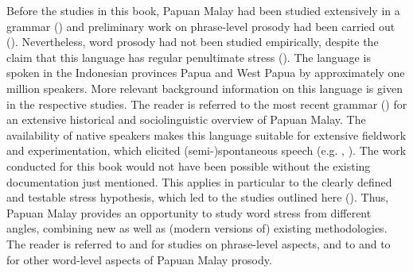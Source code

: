 Before the studies in this book, Papuan Malay had been studied extensively in a grammar (\citealt{kluge_grammar_2017}) and preliminary work on phrase-level prosody had been carried out (\citealt{riesberg_perception_2018}). Nevertheless, word prosody had not been studied empirically, despite the claim that this language has regular penultimate stress (\citealt{kluge_grammar_2017}). The language is spoken in the Indonesian provinces Papua and West Papua by approximately one million speakers. More relevant background information on this language is given in the respective studies. The reader is referred to the most recent grammar (\citealt{kluge_grammar_2017}) for an extensive historical and sociolinguistic overview of Papuan Malay. The availability of native speakers makes this language suitable for extensive fieldwork and experimentation, which elicited (semi-)spontaneous speech (e.g. \citealt{riesberg_dobes_2012}, \citealt{kluge_papuan_2014}). The work conducted for this book would not have been possible without the existing documentation just mentioned. This applies in particular to the clearly defined and testable stress hypothesis, which led to the studies outlined here (\citealt{kluge_grammar_2017}). Thus, Papuan Malay provides an opportunity to study word stress from different angles, combining new as well as (modern versions of) existing methodologies. The reader is referred to \citet{kaland_demarcating_2020} and \citet{kaland_red_2023} for studies on phrase-level aspects, and to \citet{kaland_repetition_2018} and to \citet{kaland_role_2022} for other word-level aspects of Papuan Malay prosody.

